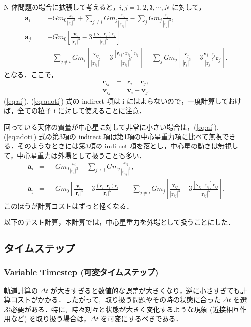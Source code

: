 \documentclass[11pt,a4paper,oneside,onecolumn]{jarticle}
\begin{document}
N 体問題の場合に拡張して考えると，$i, j = 1, 2, 3, \cdots, N$ に対して，
\begin{eqnarray}
{\bm a}_i & = & - G m_0 \frac{{\bm r}_i}{|{\bm r}_i|^3}  + \sum_{j \not= i} G m_j \frac{{\bm r}_{ij}}{|{\bm r}_{ij} |^3} - \sum_j G m_j \frac{{\bm r}_j}{|{\bm r}_j|^3}, \label{eq:ai} \\
\dot{{\bm a}}_j & = & - G m_0 \left[ \frac{{\bm v}_i}{|{\bm r}_i|^3} - 3 \frac{({\bm v}_i \cdot {\bm r}_i) {\bm r}_i}{|{\bm r}_i|^5} \right] \nonumber \\ 
& & - \sum_{j \not= i} G m_j \left[ \frac{{\bm v}_{ij}}{|{\bm r}_{ij}|^3} - 3 \frac{[{\bm v}_{ij} \cdot {\bm r}_{ij}] {\bm r}_{ij}}{|{\bm r}_{ij}|^5} \right] - \sum_j G m_j \left[ \frac{{\bm v}_j}{|{\bm r}_j|^3} - 3 \frac{{\bm v}_j \cdot {\bm r}_j}{|{\bm r}_j|^5} {\bm r}_j \right]. \label{eq:adoti}
\end{eqnarray}
となる．ここで，
\begin{eqnarray}
{\bm r}_{ij} & = & {\bm r}_{i} - {\bm r}_{j}, \\
{\bm v}_{ij} & = & {\bm v}_{i} - {\bm v}_{j}.
\end{eqnarray}
(\ref{eq:ai}), (\ref{eq:adoti}) 式の indirect 項は i にはよらないので，一度計算しておけば，全ての粒子 i に対して使えることに注意．

回っている天体の質量が中心星に対して非常に小さい場合は，(\ref{eq:ai}), (\ref{eq:adoti}) 式の第3項の indirect 項は第1項の中心星重力項に比べて無視できる．そのようなときには第3項の indirect 項を落とし，中心星の動きは無視して，中心星重力は外場として扱うことも多い．
\begin{eqnarray}
{\bm a}_i & = & - G m_0 \frac{{\bm r}_i}{|{\bm r}_i|^3}  + \sum_{j \not= i} G m_j \frac{{\bm r}_{ij}}{|{\bm r}_{ij} |^3},  \\
\dot{{\bm a}}_j & = & - G m_0 \left[ \frac{{\bm v}_i}{|{\bm r}_i|^3} - 3 \frac{({\bm v}_i \cdot {\bm r}_i) {\bm r}_i}{|{\bm r}_i|^5} \right] - \sum_{j \not= i} G m_j \left[ \frac{{\bm v}_{ij}}{|{\bm r}_{ij}|^3} - 3 \frac{[{\bm v}_{ij} \cdot {\bm r}_{ij}] {\bm r}_{ij}}{|{\bm r}_{ij}|^5} \right].
\end{eqnarray}
このほうが計算コストはずっと軽くなる．

以下のテスト計算，本計算では，中心星重力を外場として扱うことにした．

\subsection{タイムステップ \label{sec:timestep}}
\subsubsection{Variable Timestep (可変タイムステップ) \label{sec:variable}}
軌道計算の $\Delta t$ が大きすぎると数値的な誤差が大きくなり，逆に小さすぎても計算コストがかかる．したがって，取り扱う問題やその時の状態に合った $\Delta t$ を選ぶ必要がある．特に，時々刻々と状態が大きく変化するような現象 (近接相互作用など) を取り扱う場合は，$\Delta t$ を可変にするべきである．
\end{document}
